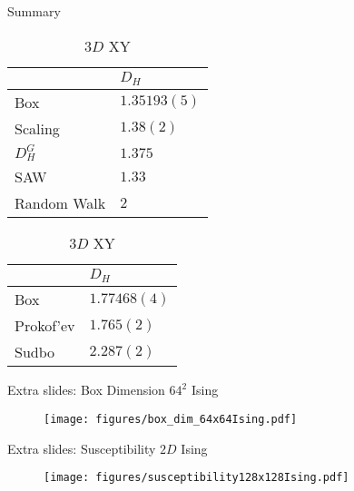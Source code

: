 \documentclass[10pt]{beamer}
\begin{document}
\begin{frame}{Summary}
    \begin{table}
        \parbox{.45\linewidth}{
            \centering
            \begin{tabular}{l|l}
                               & $D_H$          \\ \hline
                Box            & $1.35193(5)$   \\ \hline
                Scaling        & $1.38(2)$      \\ \hline
                $D_H^G$        & $1.375$        \\ \hline
                SAW            & $1.33$         \\ \hline
                Random Walk    & $2$                          
            \end{tabular}
            \caption{$2D$ Ising}
        }
        \hfill
        \parbox{.45\linewidth}{
            \centering
            \begin{tabular}{l|l}
                            & $D_H$           \\ \hline
                Box         & $1.77468(4)$    \\ \hline
                Prokof'ev   & $1.765(2)$      \\ \hline
                Sudbo       & $2.287(2)$  
            \end{tabular}
            \caption{$3D$ XY}
        }
    \end{table}
\end{frame}

\appendix

\begin{frame}[fragile]{Extra slides: Box Dimension $64^2$ Ising}
    \begin{figure}[h!]
        \centering
            \texttt{[image: figures/box\_dim\_64x64Ising.pdf]}
    \end{figure}
\end{frame}

\begin{frame}[fragile]{Extra slides: Susceptibility $2D$ Ising}
    \begin{figure}[h!]
        \centering
            \texttt{[image: figures/susceptibility128x128Ising.pdf]}
    \end{figure}
\end{frame}
\end{document}
